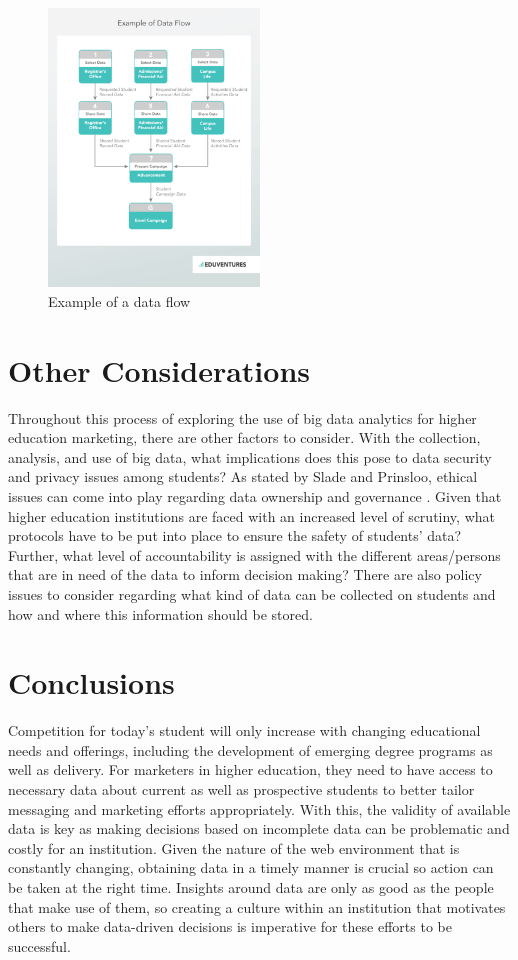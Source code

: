 \documentclass[sigconf]{acmart}
\begin{document}
\begin{figure}[p!]
    \includegraphics[width=0.5\textwidth]{dataflow2}
    \caption{Example of a data flow \cite{Wiley2016}}
    \label{fig:figure1}
\end{figure}

\section{Other Considerations}
Throughout this process of exploring the use of big data analytics for higher education marketing, there are other factors to consider. With the collection, analysis, and use of big data, what implications does this pose to data security and privacy issues among students? As stated by Slade and Prinsloo, ethical issues can come into play regarding data ownership and governance \cite{Slade2013}. Given that higher education institutions are faced with an increased level of scrutiny, what protocols have to be put into place to ensure the safety of students' data? Further, what level of accountability is assigned with the different areas/persons that are in need of the data to inform decision making? There are also policy issues to consider regarding what kind of data can be collected on students and how and where this information should be stored. 

\section{Conclusions}

Competition for today's student will only increase with changing educational needs and offerings, including the development of emerging degree programs as well as delivery. For marketers in higher education, they need to have access to necessary data about current as well as prospective students to better tailor messaging and marketing efforts appropriately. With this, the validity of available data is key as making decisions based on incomplete data can be problematic and costly for an institution. Given the nature of the web environment that is constantly changing, obtaining data in a timely manner is crucial so action can be taken at the right time. Insights around data are only as good as the people that make use of them, so creating a culture within an institution that motivates others to make data-driven decisions is imperative for these efforts to be successful.   
\end{document}
